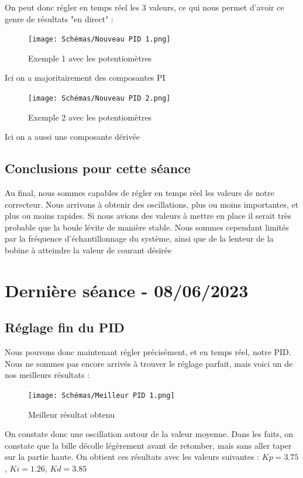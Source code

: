 \documentclass[11pt,a4paper]{article}
\begin{document}
On peut donc régler en temps réel les 3 valeurs, ce qui nous permet d'avoir ce genre de résultats "en direct" :
\begin{figure} [H]
\begin{center}
\texttt{[image: Schémas/Nouveau PID 1.png]} 
\end{center}
\caption{Exemple 1 avec les potentiomètres}
\end{figure}
Ici on a majoritairement des composantes PI

\begin{figure} [H]
\begin{center}
\texttt{[image: Schémas/Nouveau PID 2.png]} 
\end{center}
\caption{Exemple 2 avec les potentiomètres}
\end{figure}
Ici on a aussi une composante dérivée

\subsection{Conclusions pour cette séance}
Au final, nous sommes capables de régler en temps réel les valeurs de notre correcteur. Nous arrivons à obtenir des oscillations, plus ou moins importantes, et plus ou moins rapides. Si nous avions des valeurs à mettre en place il serait très probable que la boule lévite de manière stable. Nous sommes cependant limités par la fréquence d'échantillonnage du système, ainsi que de la lenteur de la bobine à atteindre la valeur de courant désirée

\section{Dernière séance - 08/06/2023}
\subsection{Réglage fin du PID}
Nous pouvons donc maintenant régler précisément, et en temps réel, notre PID. Nous ne sommes pas encore arrivés à trouver le réglage parfait, mais voici un de nos meilleurs résultats :

\begin{figure} [H]
\begin{center}
\texttt{[image: Schémas/Meilleur PID 1.png]} 
\end{center}
\caption{Meilleur résultat obtenu}
\end{figure}

On constate donc une oscillation autour de la valeur moyenne. Dans les faits, on constate que la bille décolle légèrement avant de retomber, mais sans aller taper sur la partie haute. On obtient ces résultats avec les valeurs suivantes : $Kp=3.75$, $Ki=1.26$, $Kd=3.85$
\end{document}
